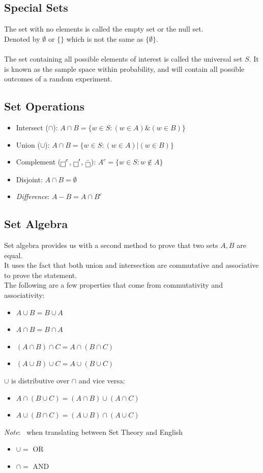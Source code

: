 \documentclass[nobib]{tufte-handout}
\newcommand{\note}[1]{
        \begin{notebox}
        \noindent\textit{Note}:\ #1
        \end{notebox}
}
\begin{document}
\subsection{Special Sets}
The set with no elements is called the empty set or the null set.\\ Denoted by
$\emptyset \text{ or } \{\}$ which is not the same as $\{\emptyset\}$.\\~\\ The
set containing all possible elements of interest is called the universal set
$S$. It is known as the sample space within probability, and will contain all
possible outcomes of a random experiment.\\
\subsection{Set Operations}
\begin{itemize}
    \item Intersect ($\cap$): $A\cap B = \{w \in S: (w \in A) \& (w \in B) \}$
    \item Union ($\cup$): $A\cap B = \{w \in S: (w \in A) | (w\in B)\}$
    \item Complement ($\fbox{\phantom{}}^c$, $\fbox{\phantom{}}'$,
          $\bar{\fbox{\phantom{}}}$): $A^c = \{w \in S: w \not \in A\}$
    \item Disjoint: $A\cap B = \emptyset$
    \item \textit{Difference}: $A-B = A\cap B^c$
\end{itemize}
\subsection{Set Algebra}
Set algebra provides us with a second method to prove that two sets $A,B$ are
equal.\\ It uses the fact that both union and intersection are commutative and
associative to prove the statement.\\ The following are a few properties that
come from commutativity and associativity:
\begin{itemize}
    \item $A\cup B = B\cup A$
    \item $A\cap B = B\cap A$
    \item $(A\cap B)\cap C = A \cap(B\cap C)$
    \item $(A\cup B)\cup C = A \cup(B\cup C)$
\end{itemize}
$\cup$ is distributive over $\cap$ and vice versa:
\begin{itemize}
    \item $A \cap (B\cup C) = (A\cap B) \cup (A\cap C)$
    \item $A \cup (B\cap C) = (A\cup B) \cap (A\cup C)$
\end{itemize}
\note{ when translating between Set Theory and English
    \begin{itemize}
        \item $\cup = $ OR
        \item $\cap = $ AND
    \end{itemize}
}
\end{document}
